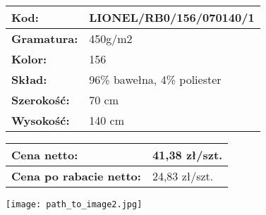 \documentclass[a4paper,10pt]{article}
\begin{document}
\begin{minipage}{0.5\textwidth}
  \begin{tabular}{|l|l|}
    \hline
    \textbf{Kod:} & LIONEL/RB0/156/070140/1 \\ \hline
    \textbf{Gramatura:} & 450g/m2 \\ \hline
    \textbf{Kolor:} & 156 \\ \hline
    \textbf{Skład:} & 96\% bawełna, 4\% poliester \\ \hline
    \textbf{Szerokość:} & 70 cm \\ \hline
    \textbf{Wysokość:} & 140 cm \\ \hline
  \end{tabular}
  \vspace{0.5cm}
  \begin{tabular}{|l|l|}
    \hline
    \textbf{Cena netto:} & 41,38 zł/szt. \\ \hline
    \textbf{Cena po rabacie netto:} & 24,83 zł/szt. \\ \hline
  \end{tabular}
\end{minipage}
\begin{minipage}{0.5\textwidth}
  \centering
  \texttt{[image: path\_to\_image2.jpg]} %
\end{minipage}
\end{document}
